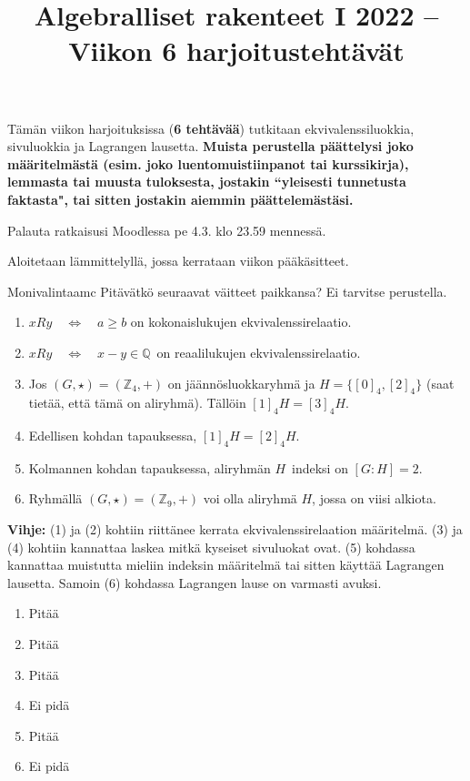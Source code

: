 \documentclass[11pt,a4paper]{amsart}
\title{Algebralliset rakenteet I 2022 -- Viikon 6 harjoitustehtävät}
\newcommand{\Z}{\mathbb{Z}}
\newcommand{\Q}{\mathbb{Q}}
\newcommand{\1}{\mathbf{1}}
\begin{document}
\maketitle

Tämän viikon harjoituksissa ({\bf 6 tehtävää}) tutkitaan ekvivalenssiluokkia, sivuluokkia ja Lagrangen lausetta. {\bf Muista perustella päättelysi joko määritelmästä (esim. joko luentomuistiinpanot tai kurssikirja), lemmasta tai muusta tuloksesta, jostakin ``yleisesti tunnetusta faktasta", tai sitten jostakin aiemmin päättelemästäsi.}

Palauta ratkaisusi Moodlessa pe 4.3. klo 23.59 mennessä.

\medskip

Aloitetaan lämmittelyllä, jossa kerrataan viikon pääkäsitteet.
\begin{Exercises}{Monivalintaa}{mc}
Pitävätkö seuraavat väitteet paikkansa? Ei tarvitse perustella. 
\begin{enumerate}
\item $xRy \quad \Leftrightarrow \quad a\geq b$ on kokonaislukujen ekvivalenssirelaatio. 
\item $xRy\quad \Leftrightarrow \quad x-y\in \Q$ on reaalilukujen ekvivalenssirelaatio.
\item Jos $(G,\star)=(\Z_4,+)$ on jäännösluokkaryhmä ja $H=\{[0]_4,[2]_4\}$ (saat tietää, että tämä on aliryhmä). Tällöin $[1]_4H=[3]_4H$.
\item Edellisen kohdan tapauksessa, $[1]_4H=[2]_4H$.
\item Kolmannen kohdan tapauksessa, aliryhmän $H$ indeksi on $[G:H]=2$.
\item Ryhmällä $(G,\star)=(\Z_9,+)$ voi olla aliryhmä $H$, jossa on viisi alkiota. 
\end{enumerate}
{\bf Vihje:} (1) ja (2) kohtiin riittänee kerrata ekvivalenssirelaation määritelmä. (3) ja (4) kohtiin kannattaa laskea mitkä kyseiset sivuluokat ovat. (5) kohdassa kannattaa muistutta mieliin indeksin määritelmä tai sitten käyttää Lagrangen lausetta. Samoin (6) kohdassa Lagrangen lause on varmasti avuksi.
\end{Exercises}

\begin{Solution}
  \begin{enumerate}
    \item Pitää
    \item Pitää
    \item Pitää
    \item Ei pidä
    \item Pitää
    \item Ei pidä
  \end{enumerate}
\end{Solution}
\end{document}
